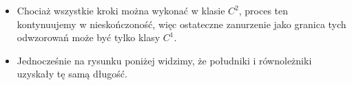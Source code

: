 \begin{frame}
\begin{itemize}
\item Chociaż wszystkie kroki można wykonać w klasie $C^2$, proces ten kontynuujemy w nieskończoność, więc ostateczne zanurzenie jako granica tych odwzorowań może być tylko klasy $C^1$.
\pause \item Jednocześnie na rysunku poniżej widzimy, że południki i równoleżniki uzyskały tę samą długość.
\begin{center}

\end{center}
\end{itemize}
\end{frame}

